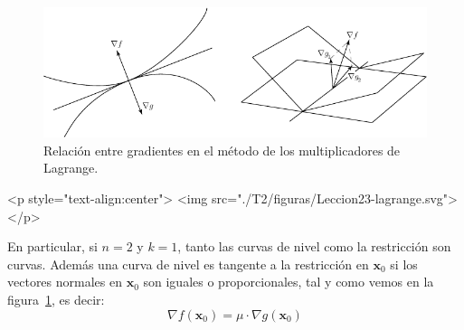 \begin{figure}
\begin{center}
\includegraphics{T2/figs/lagrange.pdf}
\end{center}
\caption{Relación entre gradientes en el método de los multiplicadores de Lagrange.}\label{fig:lag-part}
\end{figure}
\begin{rawhtml}
<p style="text-align:center">
    <img src="./T2/figuras/Leccion23-lagrange.svg"></p>
\end{rawhtml}
%
En particular, si $n=2$ y $k=1$, tanto las curvas de nivel como la restricción son curvas.
Además una curva de nivel es tangente a la restricción en $\boldsymbol x_0$ si los vectores normales en $\boldsymbol x_0$ son iguales o proporcionales, tal y como vemos en la figura~\ref{fig:lag-part}, es decir:
\[
\nabla f(\boldsymbol x_0)= \mu\cdot\nabla g(\boldsymbol x_0)
\]
%
